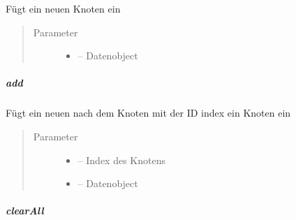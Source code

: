 \documentclass[letterpaper,10pt,ngerman]{sphinxmanual}
\begin{document}
\begin{fulllineitems}
\label{\detokenize{com/linuxluigi/edu/list/Listlabel:com.linuxluigi.edu.list.Listlabel.add(T)}}
Fügt ein neuen Knoten ein
\begin{quote}\begin{description}
\item[{Parameter}] \leavevmode\begin{itemize}
\item {} 
 -- Datenobject

\end{itemize}

\end{description}\end{quote}

\end{fulllineitems}



\subparagraph{add}
\label{\detokenize{com/linuxluigi/edu/list/Listlabel:id1}}

\begin{fulllineitems}
\label{\detokenize{com/linuxluigi/edu/list/Listlabel:com.linuxluigi.edu.list.Listlabel.add(int, T)}}
Fügt ein neuen nach dem Knoten mit der ID index ein Knoten ein
\begin{quote}\begin{description}
\item[{Parameter}] \leavevmode\begin{itemize}
\item {} 
 -- Index des Knotens

\item {} 
 -- Datenobject

\end{itemize}

\end{description}\end{quote}

\end{fulllineitems}



\subparagraph{clearAll}
\label{\detokenize{com/linuxluigi/edu/list/Listlabel:clearall}}
\end{document}
